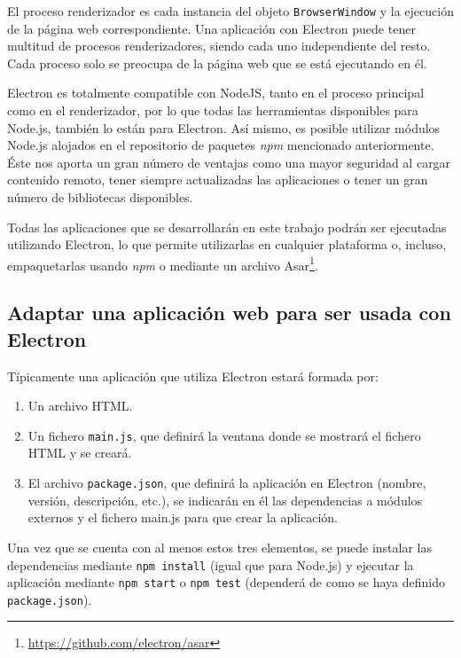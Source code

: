 El proceso renderizador es cada instancia del objeto \texttt{BrowserWindow} y la ejecución de la página web correspondiente. Una aplicación con Electron puede tener multitud de procesos renderizadores, siendo cada uno independiente del resto. Cada proceso solo se preocupa de la página web que se está ejecutando en él.

Electron es totalmente compatible con NodeJS, tanto en el proceso principal como en el renderizador, por lo que todas las herramientas disponibles para Node.js, también lo están para Electron. Así mismo, es posible utilizar módulos Node.js alojados en el repositorio de paquetes \textit{npm} mencionado anteriormente. Éste nos aporta un gran número de ventajas como una mayor seguridad al cargar contenido remoto, tener siempre actualizadas las aplicaciones o tener un gran número de bibliotecas disponibles.

Todas las aplicaciones que se desarrollarán en este trabajo podrán ser ejecutadas utilizando Electron, lo que permite utilizarlas en cualquier plataforma o, incluso, empaquetarlas usando \textit{npm} o mediante un archivo Asar\footnote{\url{https://github.com/electron/asar}}.

\subsection{Adaptar una aplicación web para ser usada con Electron}

Típicamente una aplicación que utiliza Electron estará formada por:

\begin{enumerate}
\item Un archivo HTML.
\item Un fichero \texttt{main.js}, que definirá la ventana donde se mostrará el fichero HTML y se creará.
\item El archivo \texttt{package.json}, que definirá la aplicación en Electron (nombre, versión, descripción, etc.), se indicarán en él las dependencias a módulos externos y el fichero main.js para que crear la aplicación.
\end{enumerate}
Una vez que se cuenta con al menos estos tres elementos, se puede instalar las dependencias mediante \texttt{npm install} (igual que para Node.js) y ejecutar la aplicación mediante \texttt{npm start} o \texttt{npm test} (dependerá de como se haya definido \texttt{package.json}).

